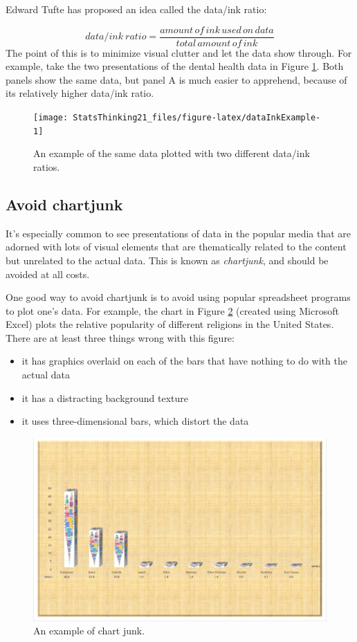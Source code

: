 \documentclass[
  12pt,
]{book}
\providecommand{\tightlist}{%
  \setlength{\itemsep}{0pt}\setlength{\parskip}{0pt}}
\begin{document}
Edward Tufte has proposed an idea called the data/ink ratio:

\[
data/ink\ ratio = \frac{amount\, of\, ink\, used\, on\, data}{total\, amount\, of\, ink}
\]
The point of this is to minimize visual clutter and let the data show through. For example, take the two presentations of the dental health data in Figure \ref{fig:dataInkExample}. Both panels show the same data, but panel A is much easier to apprehend, because of its relatively higher data/ink ratio.

\begin{figure}
\texttt{[image: StatsThinking21\_files/figure-latex/dataInkExample-1]} \caption{An example of the same data plotted with two different data/ink ratios.}\label{fig:dataInkExample}
\end{figure}

\hypertarget{avoid-chartjunk}{%
\subsection{Avoid chartjunk}\label{avoid-chartjunk}}

It's especially common to see presentations of data in the popular media that are adorned with lots of visual elements that are thematically related to the content but unrelated to the actual data. This is known as \emph{chartjunk}, and should be avoided at all costs.

One good way to avoid chartjunk is to avoid using popular spreadsheet programs to plot one's data. For example, the chart in Figure \ref{fig:chartJunk} (created using Microsoft Excel) plots the relative popularity of different religions in the United States. There are at least three things wrong with this figure:

\begin{itemize}
\tightlist
\item
  it has graphics overlaid on each of the bars that have nothing to do with the actual data
\item
  it has a distracting background texture
\item
  it uses three-dimensional bars, which distort the data
\end{itemize}

\begin{figure}
\includegraphics[width=0.8\linewidth,height=0.5\textheight]{images/excel_chartjunk} \caption{An example of chart junk.}\label{fig:chartJunk}
\end{figure}
\end{document}
